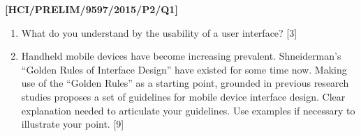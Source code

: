 \item \textbf{{[}HCI/PRELIM/9597/2015/P2/Q1{]} }
\begin{enumerate}
\item What do you understand by the usability of a user interface?\hfill{}
{[}3{]}
\item Handheld mobile devices have become increasing prevalent. Shneiderman\textquoteright s
\textquotedblleft Golden Rules of Interface Design\textquotedblright{}
have existed for some time now. Making use of the \textquotedblleft Golden
Rules\textquotedblright{} as a starting point, grounded in previous
research studies proposes a set of guidelines for mobile device interface
design. Clear explanation needed to articulate your guidelines. Use
examples if necessary to illustrate your point.\hfill{} {[}9{]}
\end{enumerate}